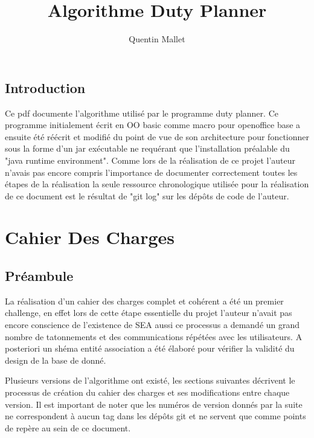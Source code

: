 \documentclass[11pt]{report}
\begin{document}
\title{Algorithme Duty Planner}

\author{Quentin Mallet}


\maketitle

\tableofcontents

\section{Introduction}
Ce pdf documente l'algorithme utilisé par le programme duty planner.
Ce programme initialement écrit en OO basic\cite{basicguide} comme macro pour openoffice base a ensuite été réécrit et modifié du point de vue de son architecture pour fonctionner sous la forme d'un jar exécutable ne requérant que l'installation préalable du "java runtime environment". 
Comme lors de la réalisation de ce projet l'auteur n'avais pas encore compris l'importance de documenter correctement toutes les étapes de la réalisation la seule ressource chronologique utilisée pour la réalisation de ce document est le résultat de "git log" sur les dépôts de code de l'auteur.

\chapter{Cahier Des Charges}
\section{Préambule}
La réalisation d'un cahier des charges complet et cohérent a été un premier challenge, en effet lors de cette étape essentielle du projet l'auteur n'avait pas encore conscience de l'existence de SEA\cite{sea} aussi ce processus a demandé un grand nombre de tatonnements et des communications répétées avec les utilisateurs. 
A posteriori un shéma entité association a été élaboré pour vérifier la validité du design de la base de donné.

Plusieurs versions de l'algorithme ont existé, les sections suivantes décrivent le processus de création du cahier des charges et ses modifications entre chaque version. 
Il est important de noter que les numéros de version donnés par la suite ne correspondent à aucun tag dans les dépôts git et ne servent que comme points de repère au sein de ce document.
\end{document}

